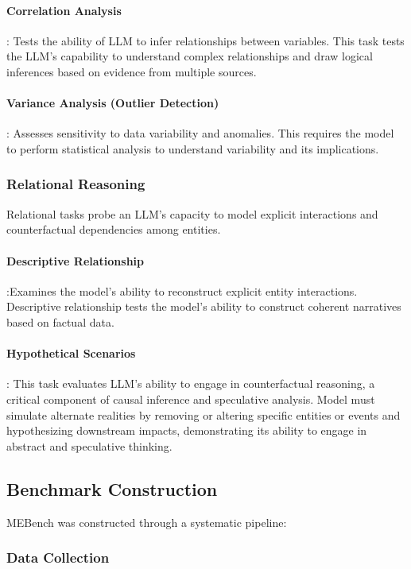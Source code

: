 \paragraph{Correlation Analysis}: Tests the ability of LLM to infer relationships between variables. This task tests the LLM's capability to understand complex relationships and draw logical inferences based on evidence from multiple sources. 

\paragraph{Variance Analysis (Outlier Detection)}: Assesses sensitivity to data variability and anomalies. This requires the model to perform statistical analysis to understand variability and its implications.

\subsubsection{Relational Reasoning}
Relational tasks probe an LLM’s capacity to model explicit interactions and counterfactual dependencies among entities.

\paragraph{Descriptive Relationship}:Examines the model’s ability to reconstruct explicit entity interactions. Descriptive relationship tests the model's ability to construct coherent narratives based on factual data.

\paragraph{Hypothetical Scenarios}: This task evaluates LLM’s ability to engage in counterfactual reasoning, a critical component of causal inference and speculative analysis. Model must simulate alternate realities by removing or altering specific entities or events and hypothesizing downstream impacts, demonstrating its ability to engage in abstract and speculative thinking.
\subsection{Benchmark Construction}
MEBench was constructed through a systematic pipeline:  
\subsubsection{Data Collection} 

